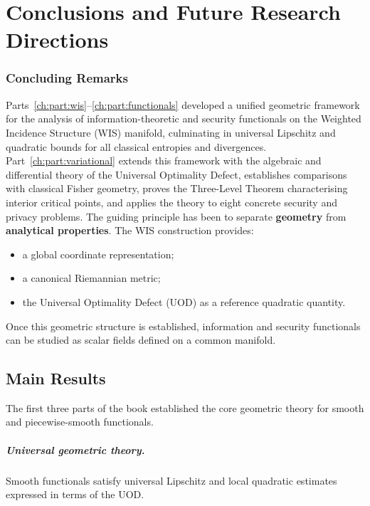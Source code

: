 \chapter[Conclusions]{Conclusions and Future Research Directions}\label{ch:sec:conclusions-and-future-research-directions}

\subsection{Concluding Remarks}\label{ch:sec:concluding-remarks}

Parts~\ref{ch:part:wis}--\ref{ch:part:functionals} developed a unified geometric framework for the analysis of
information-theoretic and security functionals on the Weighted Incidence
Structure (WIS) manifold, culminating in universal Lipschitz and quadratic
bounds for all classical entropies and divergences.  Part~\ref{ch:part:variational}
extends this framework with the algebraic and differential theory of the
Universal Optimality Defect, establishes comparisons with classical Fisher
geometry, proves the Three-Level Theorem characterising interior critical
points, and applies the theory to eight concrete security and privacy problems.
The guiding principle has been to separate \textbf{geometry} from
\textbf{analytical properties}.
The WIS construction provides:
\begin{itemize}
\item a global coordinate representation;
\item a canonical Riemannian metric;
\item the Universal Optimality Defect (UOD) as a reference quadratic quantity.
\end{itemize}
Once this geometric structure is established, information and security
functionals can be studied as scalar fields defined on a common
manifold.

\section{Main Results}\label{ch:sec:main-results}

The first three parts of the book established the core geometric theory
for smooth and piecewise-smooth functionals.

\paragraph{Universal geometric theory.}
Smooth functionals satisfy universal Lipschitz and local quadratic
estimates expressed in terms of the UOD.

